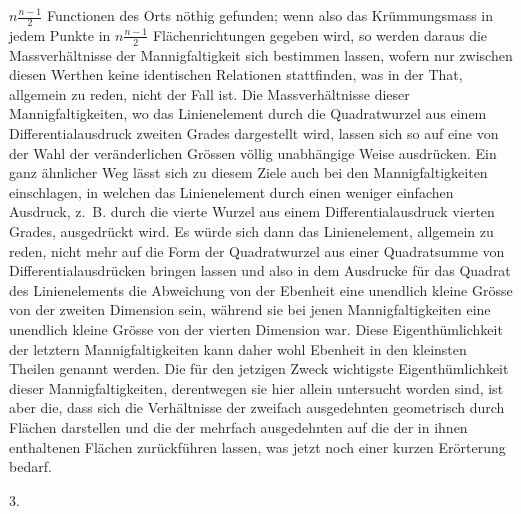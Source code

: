 \documentclass[a4paper,12pt]{article}
\begin{document}
$\displaystyle n \frac{n-1}{2}$
Functionen des Orts n\"{o}thig gefunden; wenn also das
Kr\"{u}mmungsmass in jedem Punkte in
$\displaystyle n \frac{n-1}{2}$
Fl\"{a}chenrichtungen gegeben wird, so werden daraus die
Massverh\"{a}ltnisse der Mannigfaltigkeit sich bestimmen lassen,
wofern nur zwischen diesen Werthen keine identischen Relationen
stattfinden, was in der That, allgemein zu reden, nicht der Fall
ist.  Die Massverh\"{a}ltnisse dieser Mannigfaltigkeiten, wo das
Linienelement durch die Quadratwurzel aus einem
Differentialausdruck zweiten Grades dargestellt wird, lassen sich
so auf eine von der Wahl der ver\"{a}nderlichen Gr\"{o}ssen
v\"{o}llig unabh\"{a}ngige Weise ausdr\"{u}cken.  Ein ganz
\"{a}hnlicher Weg l\"{a}sst sich zu diesem Ziele auch bei den
Mannigfaltigkeiten einschlagen, in welchen das Linienelement
durch einen weniger einfachen Ausdruck, z.~B. durch die vierte
Wurzel aus einem Differentialausdruck vierten Grades,
ausgedr\"{u}ckt wird.  Es w\"{u}rde sich dann das Linienelement,
allgemein zu reden, nicht mehr auf die Form der Quadratwurzel aus
einer Quadratsumme von Differentialausdr\"{u}cken bringen lassen
und also in dem Ausdrucke f\"{u}r das Quadrat des Linienelements
die Abweichung von der Ebenheit eine unendlich kleine Gr\"{o}sse
von der zweiten Dimension sein, w\"{a}hrend sie bei jenen
Mannigfaltigkeiten eine unendlich kleine Gr\"{o}sse von der
vierten Dimension war.  Diese Eigenth\"{u}mlichkeit der letztern
Mannigfaltigkeiten kann daher wohl Ebenheit in den kleinsten
Theilen genannt werden.  Die f\"{u}r den jetzigen Zweck
wichtigste Eigenth\"{u}mlichkeit dieser Mannigfaltigkeiten,
derentwegen sie hier allein untersucht worden sind, ist aber die,
dass sich die Verh\"{a}ltnisse der zweifach ausgedehnten
geometrisch durch Fl\"{a}chen darstellen und die der mehrfach
ausgedehnten auf die der in ihnen enthaltenen Fl\"{a}chen
zur\"{u}ckf\"{u}hren lassen, was jetzt noch einer kurzen
Er\"{o}rterung bedarf.

\medbreak

\centerline{3.}

\nobreak\medskip
\end{document}
